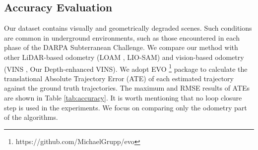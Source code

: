 \subsection{Accuracy Evaluation}
Our dataset contains visually and geometrically degraded scenes. Such conditions are common in underground environments, such as those encountered in each phase of the DARPA Subterranean Challenge. We compare our method with other LiDAR-based odometry (LOAM \cite{loam}, LIO-SAM\cite{shan2020liosam}) and vision-based odometry (VINS \cite{VINS}, Our Depth-enhanced VINS\cite{vinsicra}). We adopt EVO \footnote{https://github.com/MichaelGrupp/evo}  package to calculate the translational Absolute Trajectory Error (ATE) of each estimated trajectory against the ground truth trajectories. The maximum and RMSE results of ATEs are shown in Table \ref{tab:accuracy}. It is worth mentioning that no loop closure step is used in the experiments. We focus on comparing only the odometry part of the 
algorithms.

\begin{table}[htbp]
    \centering
    \caption{Accuracy Evaluation of LOAM, LIO-SAM, VINS, VINS-Depth, and Our Method Operating in Challenging Environments}
    \label{tab:accuracy}
    \vspace{1mm}
    \vspace{-3mm}
\end{table}




